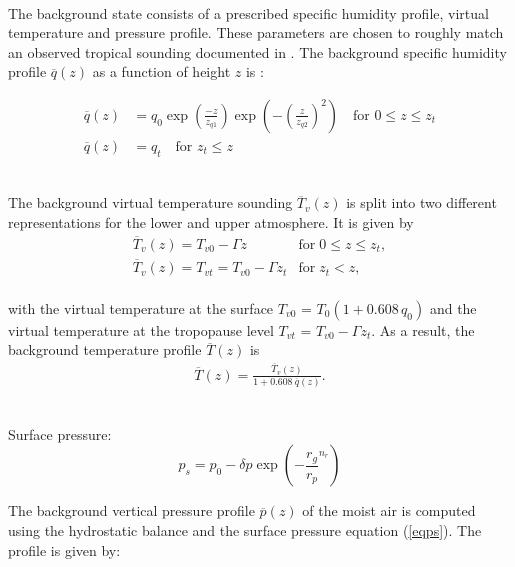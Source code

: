 \documentclass[times,doublespace]{fldauth}
\begin{document}
~\\ The background state consists of a prescribed specific humidity profile, virtual temperature and pressure profile.  These parameters are chosen to roughly match an observed tropical sounding documented in \cite{jordan:58}.  The background specific humidity profile $\overline{q}(z)$ as a function of height $z$ is :

\begin{equation}
\begin{split}
\overline{q}(z)&=q_0 \exp\left(\frac{-z}{z_{q1}}\right)\exp\left(-\left(\frac{z}{z_{q2}}\right)^2\right) \text{ ~~for   } 0 \leq z \leq z_t \\
\overline{q}(z)&=q_t  \text{ ~~for   }  z_t \leq z
\end{split}
\end{equation}


~\\The background virtual temperature sounding $\overline{T}_v(z)$ is split into two different representations for the lower and upper atmosphere.  It is given by
\begin{equation}
\begin{array}{ll} \label{eq2}
\overline{T}_v(z) = T_{v0} - \Gamma z & \mbox{for} \; 0 \le z \le z_t, \\
\overline{T}_v(z) = T_{vt} = T_{v0} - \Gamma z_t & \mbox{for} \; z_t < z, 
\end{array}
\end{equation}
~\\with the virtual temperature at the surface $T_{v0}$ = $T_0 (1+0.608 \, q_0)$ and the virtual temperature at the tropopause level $T_{vt}$ = $T_{v0} - \Gamma z_t$.  As a result, the background temperature profile $\overline{T}(z)$ is
\begin{eqnarray} \label{eq3}
\overline{T}(z) = \frac{\overline{T}_v(z)}{1 + 0.608\ \overline{q}(z)}.
\end{eqnarray}


~\\ Surface pressure:
\begin{equation}
p_s=p_0-\delta p \exp\left(-\frac{r_g}{r_p}^{n_r}\right)
\label{eqps}
\end{equation}

The background vertical pressure profile $\overline{p}(z)$ of the moist air is computed using the hydrostatic balance and the surface pressure equation (\ref{eqps}). The profile is given by:
\end{document}
